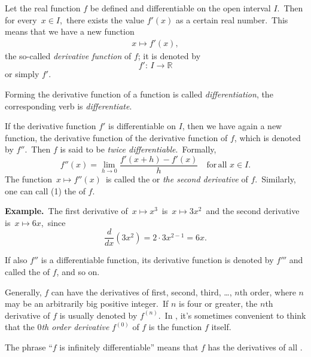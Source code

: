 \documentclass[12pt]{article}
\theoremstyle{definition}
\begin{document}

Let the real function $f$ be defined and differentiable on the open interval $I$.\, Then for every\, $x \in I$,\, there exists the value $f'(x)$ as a certain real number.\, This means that we have a new function
\begin{align}
x \mapsto f'(x),
\end{align}
the so-called {\em derivative function} of $f$; it is denoted by 
$$f':\, I\to \mathbb{R}$$
or simply $f'$.

Forming the derivative function of a function is called {\em differentiation}, the corresponding verb is {\em differentiate}.

If the derivative function $f'$ is differentiable on $I$, then we have again a new function, the derivative function of the derivative function of $f$, which is denoted by $f''$.\, Then $f$ is said to be \emph{twice differentiable}.\, Formally,
$$f''(x) = \lim_{h\to 0}\frac{f'(x+h)-f'(x)}{h}\quad \mathrm{for\,all\,}\,x\in I.$$
The function\, $x\mapsto f''(x)$\, is called the  or {\em the second derivative} of $f$.\, Similarly, one can call (1) the  of $f$.

\textbf{Example.}\, The first derivative of\, $x\mapsto x^3$\, is\, $x\mapsto 3x^2$\, and the second derivative is\, $x\mapsto 6x$,\, since
$$\frac{d}{dx}(3x^2) = 2\cdot 3x^{2-1} = 6x.$$

If also $f''$ is a differentiable function, its derivative function is denoted by $f'''$ and called the  of $f$, and so on.

Generally, $f$ can have the derivatives of first, second, third, \ldots, $n$th order, where $n$ may be an arbitrarily big positive integer.\, If $n$ is four or greater, the $n$th derivative of $f$ is usually denoted by $f^{(n)}$.\, In , it's sometimes convenient to think that the $0${\em th order derivative} $f^{(0)}$ of $f$ is the function $f$ itself.

The phrase ``$f$ is infinitely differentiable'' means that $f$ has the derivatives of all .
\end{document}
